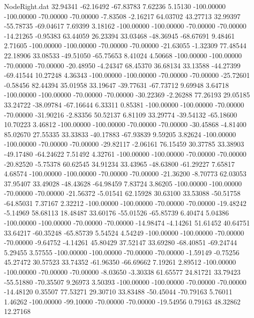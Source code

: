 \begin{filecontents}{NodeRight.dat}
  32.94341  -62.16492  -67.83783     7.62236    5.15130 -100.00000 -100.00000  -70.00000  -70.00000   -7.83508   -2.16217   64.03702   43.27713
  32.99397  -55.78735  -69.04617     7.69399    3.18162 -100.00000 -100.00000  -70.00000  -70.00000  -14.21265   -0.95383   63.44059   26.23394
  33.03468  -48.36945  -68.67691     9.48461    2.71605 -100.00000 -100.00000  -70.00000  -70.00000  -21.63055   -1.32309   77.48544   22.18906
  33.08533  -49.51050  -65.75653     8.41024    4.50668 -100.00000 -100.00000  -70.00000  -70.00000  -20.48950   -4.24347   68.45370   36.68134
  33.13588  -44.27399  -69.41544    10.27248    4.36343 -100.00000 -100.00000  -70.00000  -70.00000  -25.72601   -0.58456   82.44394   35.01958
  33.19647  -39.77631  -67.73712     9.69948    3.64718 -100.00000 -100.00000  -70.00000  -70.00000  -30.22369   -2.26288   77.26193   29.05185
  33.24722  -38.09784  -67.16644     6.33311    0.85381 -100.00000 -100.00000  -70.00000  -70.00000  -31.90216   -2.83356   50.52137    6.81109
  33.29774  -39.54132  -65.18600    10.70223    3.46812 -100.00000 -100.00000  -70.00000  -70.00000  -30.45868   -4.81400   85.02670   27.55335
  33.33833  -40.17883  -67.93839     9.59205    3.82624 -100.00000 -100.00000  -70.00000  -70.00000  -29.82117   -2.06161   76.15459   30.37785
  33.38903  -49.17480  -64.24622     7.51492    4.32761 -100.00000 -100.00000  -70.00000  -70.00000  -20.82520   -5.75378   60.62545   34.91234
  33.43965  -48.63800  -61.29227     7.65817    4.68574 -100.00000 -100.00000  -70.00000  -70.00000  -21.36200   -8.70773   62.03053   37.95407
  33.49028  -48.43628  -64.98459     7.83724    3.86205 -100.00000 -100.00000  -70.00000  -70.00000  -21.56372   -5.01541   62.15928   30.63100
  33.53088  -50.51758  -64.85031     7.37167    2.32212 -100.00000 -100.00000  -70.00000  -70.00000  -19.48242   -5.14969   58.68113   18.48487
  33.60176  -55.01526  -65.85739     6.40474    5.04386 -100.00000 -100.00000  -70.00000  -70.00000  -14.98474   -4.14261   51.61452   40.64751
  33.64217  -60.35248  -65.85739     5.54524    4.54249 -100.00000 -100.00000  -70.00000  -70.00000   -9.64752   -4.14261   45.80429   37.52147
  33.69280  -68.40851  -69.24744     5.29455    3.57555 -100.00000 -100.00000  -70.00000  -70.00000   -1.59149   -0.75256   45.27472   30.57523
  33.74352  -61.96350  -66.69662     7.19261    2.89512 -100.00000 -100.00000  -70.00000  -70.00000   -8.03650   -3.30338   61.65577   24.81721
  33.79423  -55.51880  -70.35507     9.26973    3.50393 -100.00000 -100.00000  -70.00000  -70.00000  -14.48120    0.35507   77.53271   29.30710
  33.83488  -50.45044  -70.79163     5.76011    1.46262 -100.00000  -99.10000  -70.00000  -70.00000  -19.54956    0.79163   48.32862   12.27168

\end{filecontents}
